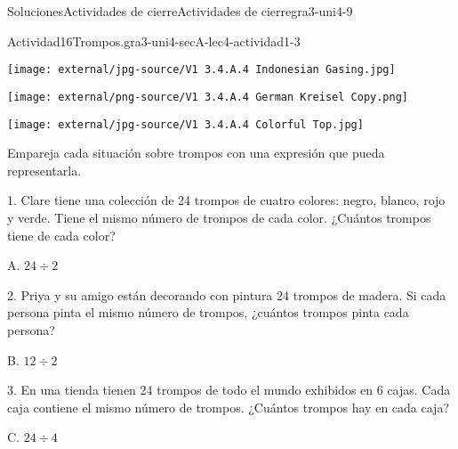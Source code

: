 \documentclass[twoside,10pt,]{article}
\begin{document}
\begin{solutions-section}{Soluciones}{Actividades de cierre}{}{Actividades de cierre}{}{}{gra3-uni4-9}
\begin{activitysolution}{Actividad}{16}{Trompos.}{gra3-uni4-secA-lec4-actividad1-3}
\begin{sidebyside}{5}{0}{0}{0}
\begin{sbspanel}{0.2}
\texttt{[image: external/jpg-source/V1 3.4.A.4 Indonesian Gasing.jpg]}
\end{sbspanel}%
\begin{sbspanel}{0.2}%
\texttt{[image: external/png-source/V1 3.4.A.4 German Kreisel Copy.png]}
\end{sbspanel}%
\begin{sbspanel}{0.2}%
\texttt{[image: external/jpg-source/V1 3.4.A.4 Colorful Top.jpg]}
\end{sbspanel}%
\end{sidebyside}%
\par
Empareja cada situación sobre trompos con una expresión que pueda representarla.%
\begin{sidebyside}{2}{0.05}{0}{0.15}%
\begin{sbspanel}{0.6}%
1. Clare tiene una colección de 24 trompos de cuatro colores: negro, blanco, rojo y verde. Tiene el mismo número de trompos de cada color. ¿Cuántos trompos tiene de cada color?%
\end{sbspanel}%
\begin{sbspanel}{0.2}%
\par
A. \(24 \div 2\)%
\end{sbspanel}%
\end{sidebyside}%
\begin{sidebyside}{2}{0.05}{0}{0.15}%
\begin{sbspanel}{0.6}%
2. Priya y su amigo están decorando con pintura 24 trompos de madera. Si cada persona pinta el mismo número de trompos, ¿cuántos trompos pinta cada persona?%
\end{sbspanel}%
\begin{sbspanel}{0.2}%
\par
B. \(12 \div 2\)%
\end{sbspanel}%
\end{sidebyside}%
\begin{sidebyside}{2}{0.05}{0}{0.15}%
\begin{sbspanel}{0.6}%
3. En una tienda tienen 24 trompos de todo el mundo exhibidos en 6 cajas. Cada caja contiene el mismo número de trompos. ¿Cuántos trompos hay en cada caja?%
\end{sbspanel}%
\begin{sbspanel}{0.2}%
\par
C. \(24 \div 4\)%
\end{sbspanel}%
\end{sidebyside}%
\begin{sidebyside}{2}{0.05}{0}{0.15}%

\end{sidebyside}
\end{activitysolution}
\end{solutions-section}
\end{document}
